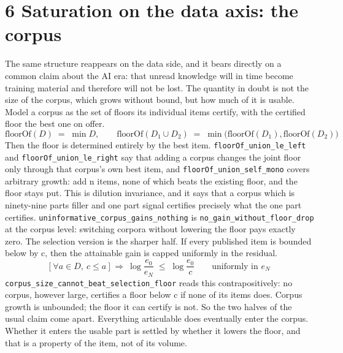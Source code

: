 \documentclass[11pt,a4paper]{article}
\theoremstyle{definition}
\theoremstyle{remark}
\begin{document}
\section*{6  Saturation on the data axis: the corpus}
The same structure reappears on the data side, and it bears directly on a common claim about the AI era: that unread knowledge will in time become training material and therefore will not be lost. The quantity in doubt is not the size of the corpus, which grows without bound, but how much of it is usable.
Model a corpus as the set of floors its individual items certify, with the certified floor the best one on offer.
\begin{equation}
\mathrm{floorOf}(D)\;=\;\min D,\qquad\mathrm{floorOf}(D_1\cup D_2)\;=\;\min\big(\mathrm{floorOf}(D_1),\mathrm{floorOf}(D_2)\big)
\tag{15}
\end{equation}
Then the floor is determined entirely by the best item. \texttt{floorOf\_\allowbreak{}union\_\allowbreak{}le\_\allowbreak{}left} and \texttt{floorOf\_\allowbreak{}union\_\allowbreak{}le\_\allowbreak{}right} say that adding a corpus changes the joint floor only through that corpus's own best item, and \texttt{floorOf\_\allowbreak{}union\_\allowbreak{}self\_\allowbreak{}mono} covers arbitrary growth: add n items, none of which beats the existing floor, and the floor stays put. This is dilution invariance, and it says that a corpus which is ninety-nine parts filler and one part signal certifies precisely what the one part certifies. \texttt{uninformative\_\allowbreak{}corpus\_\allowbreak{}gains\_\allowbreak{}nothing} is \texttt{no\_\allowbreak{}gain\_\allowbreak{}without\_\allowbreak{}floor\_\allowbreak{}drop} at the corpus level: switching corpora without lowering the floor pays exactly zero.
The selection version is the sharper half. If every published item is bounded below by c, then the attainable gain is capped uniformly in the residual.
\begin{equation}
\big[\ \forall a\in D,\ c\leq a\ \big]\ \Longrightarrow\ \log\frac{e_0}{e_N}\;\leq\;\log\frac{e_0}{c}\qquad\text{uniformly in }e_N
\tag{16}
\end{equation}
\texttt{corpus\_\allowbreak{}size\_\allowbreak{}cannot\_\allowbreak{}beat\_\allowbreak{}selection\_\allowbreak{}floor} reads this contrapositively: no corpus, however large, certifies a floor below c if none of its items does. Corpus growth is unbounded; the floor it can certify is not. So the two halves of the usual claim come apart. Everything articulable does eventually enter the corpus. Whether it enters the usable part is settled by whether it lowers the floor, and that is a property of the item, not of its volume.
\end{document}
